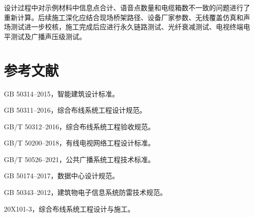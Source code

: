 \documentclass[UTF8,zihao=-4,openany]{ctexrep}
\begin{document}
设计过程中对示例材料中信息点合计、语音点数量和电缆箱数不一致的问题进行了重新计算。后续施工深化应结合现场桥架路径、设备厂家参数、无线覆盖仿真和声场测试进一步校核，施工完成后应进行永久链路测试、光纤衰减测试、电视终端电平测试及广播声压级测试。

\chapter*{参考文献}
\begin{enumerate}[label={[\arabic*]}]
  \item GB 50314--2015，智能建筑设计标准。
  \item GB 50311--2016，综合布线系统工程设计规范。
  \item GB/T 50312--2016，综合布线系统工程验收规范。
  \item GB/T 50200--2018，有线电视网络工程设计标准。
  \item GB/T 50526--2021，公共广播系统工程技术标准。
  \item GB 50174--2017，数据中心设计规范。
  \item GB 50343--2012，建筑物电子信息系统防雷技术规范。
  \item 20X101-3，综合布线系统工程设计与施工。
\end{enumerate}

\clearpage
{}
{}

\end{document}
